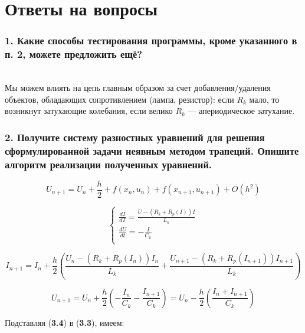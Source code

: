 \chapter{Ответы на вопросы}

\subsection*{1. Какие способы тестирования программы, кроме указанного в п. 2, можете предложить ещё?}\\

Мы можем влиять на цепь главным образом за счет добавления/удаления объектов, обладающих сопротивлением (лампа, резистор): если $R_{k}$ мало, то возникнут затухающие колебания, если велико $R_{k}$ --- апериодическое затухание.\\

\subsection*{2. Получите систему разностных уравнений для решения сформулированной задачи неявным методом трапеций. Опишите  алгоритм реализации полученных уравнений.}

\begin{equation}
    U_{n + 1} = U_{n} + \frac{h}{2} + f(x_{n}, u_{n}) + f(x_{n + 1}, u_{n + 1}) + O(h^2)
\end{equation}

\begin{equation}
    \begin{cases}
        \frac{dI}{dT} = \frac{U - (R_{k} + R_{p}(I))I}{L_{k}}\\
        \frac{dU}{dt} = -\frac{I}{C_{k}}\\
    \end{cases}
\end{equation}

\begin{equation}
    I_{n + 1} = I_{n} + \frac{h}{2} (\frac{U_{n} - (R_{k} + R_{p}(I_{n}))I_{n}}{L_{k}} + \frac{U_{n + 1} - (R_{k} + R_{p}(I_{n + 1}))I_{n + 1}}{L_{k}})
\end{equation}

\begin{equation}
    U_{n + 1} = U_{n} + \frac{h}{2}(-\frac{I_{n}}{C_{k}} -\frac{I_{n + 1}}{C_{k}}) = U_{n} - \frac{h}{2}(\frac{I_{n} + I_{n + 1}}{C_{k}})
\end{equation}

Подставляя (\textbf{3.4}) в (\textbf{3.3}), имеем:

